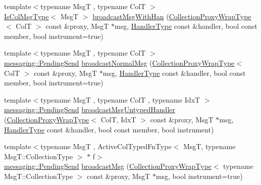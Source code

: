\begin{DoxyCompactItemize}
\item 
{\footnotesize template$<$typename MsgT , typename ColT $>$ }\\\hyperlink{structvt_1_1vrt_1_1collection_1_1_collection_manager_a21c21612c806016788057aeab142af20}{Is\+Col\+Msg\+Type}$<$ MsgT $>$ \hyperlink{structvt_1_1vrt_1_1collection_1_1_collection_manager_a737913f12b46ddaacf64a699c56c1787}{broadcast\+Msg\+With\+Han} (\hyperlink{structvt_1_1vrt_1_1collection_1_1_collection_manager_a56458ed7f9bb22b631b9b3a745f42f94}{Collection\+Proxy\+Wrap\+Type}$<$ ColT $>$ const \&proxy, MsgT $\ast$msg, \hyperlink{namespacevt_af64846b57dfcaf104da3ef6967917573}{Handler\+Type} const \&handler, bool const member, bool instrument=true)
\item 
{\footnotesize template$<$typename MsgT , typename ColT $>$ }\\\hyperlink{structvt_1_1messaging_1_1_pending_send}{messaging\+::\+Pending\+Send} \hyperlink{structvt_1_1vrt_1_1collection_1_1_collection_manager_ac5ebb9504dc55031027d8b0fbb96fe7e}{broadcast\+Normal\+Msg} (\hyperlink{structvt_1_1vrt_1_1collection_1_1_collection_manager_a56458ed7f9bb22b631b9b3a745f42f94}{Collection\+Proxy\+Wrap\+Type}$<$ ColT $>$ const \&proxy, MsgT $\ast$msg, \hyperlink{namespacevt_af64846b57dfcaf104da3ef6967917573}{Handler\+Type} const \&handler, bool const member, bool instrument=true)
\item 
{\footnotesize template$<$typename MsgT , typename ColT , typename IdxT $>$ }\\\hyperlink{structvt_1_1messaging_1_1_pending_send}{messaging\+::\+Pending\+Send} \hyperlink{structvt_1_1vrt_1_1collection_1_1_collection_manager_a493c51ab40a4040d3a8671a02d2ae741}{broadcast\+Msg\+Untyped\+Handler} (\hyperlink{structvt_1_1vrt_1_1collection_1_1_collection_manager_a56458ed7f9bb22b631b9b3a745f42f94}{Collection\+Proxy\+Wrap\+Type}$<$ ColT, IdxT $>$ const \&proxy, MsgT $\ast$msg, \hyperlink{namespacevt_af64846b57dfcaf104da3ef6967917573}{Handler\+Type} const \&handler, bool const member, bool instrument)
\item 
{\footnotesize template$<$typename MsgT , Active\+Col\+Typed\+Fn\+Type$<$ Msg\+T, typename Msg\+T\+::\+Collection\+Type $>$ $\ast$ f$>$ }\\\hyperlink{structvt_1_1messaging_1_1_pending_send}{messaging\+::\+Pending\+Send} \hyperlink{structvt_1_1vrt_1_1collection_1_1_collection_manager_a9cadcebd1d7c26512091f9624a23a02c}{broadcast\+Msg} (\hyperlink{structvt_1_1vrt_1_1collection_1_1_collection_manager_a56458ed7f9bb22b631b9b3a745f42f94}{Collection\+Proxy\+Wrap\+Type}$<$ typename Msg\+T\+::\+Collection\+Type $>$ const \&proxy, MsgT $\ast$msg, bool instrument=true)

\end{DoxyCompactItemize}
